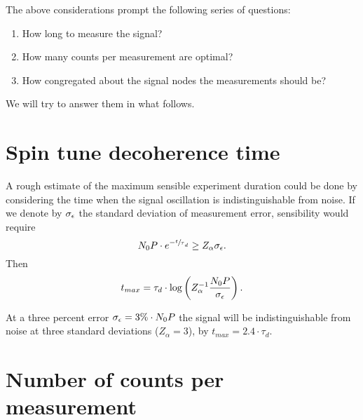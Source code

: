 \documentclass{article}
\begin{document}
The above considerations prompt the following series of questions:
\begin{enumerate}
	\item How long to measure the signal?
	\item How many counts per measurement are optimal?
	\item How congregated about the signal nodes the measurements should be?
\end{enumerate}
We will try to answer them in what follows.

\section{Spin tune decoherence time}
A rough estimate of the maximum sensible experiment duration could be done by considering the time when the signal oscillation is indistinguishable from noise. If we denote by $\SD{\meas}$ the standard deviation of measurement error, sensibility would require
\[
N_0P\cdot e^{-\sfrac t\tau_d} \geq Z_\alpha \SD{\meas}.
\]
Then 
\[
t_{max} = \tau_d\cdot \log\bkt{Z_\alpha^{-1}\frac{N_0P}{\SD{\meas}}}.
\]

At a three percent error $\SD{\meas} = 3\%\cdot N_0P$ the signal will be indistinguishable from noise at three standard deviations ($Z_\alpha = 3$), by $t_{max} = 2.4\cdot \tau_d$. 

%

\section{Number of counts per measurement}
\end{document}
